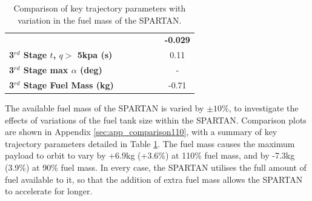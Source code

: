 \begin{table}
\begin{tabular}{l c c c c c c}
	& \textbf{\thirddExergyEffmFuelNinetyNoReturn}
	& \textbf{\thirddExergyEffmFuelNinetyFiveNoReturn}
	& \textbf{\thirddExergyEffmFuelStandardNoReturn}
	& \textbf{\thirddExergyEffmFuelOneHundredFiveNoReturn}
	& \textbf{\thirddExergyEffmFuelOneHundredTenNoReturn}
	& \textbf{-0.029}
	\\
	\textbf{3$^{rd}$ Stage $t$, $q >$ 5kpa (s)}
	& \thirdqOverFivemFuelNinetyNoReturn
	& \thirdqOverFivemFuelNinetyFiveNoReturn
	& \thirdqOverFivemFuelStandardNoReturn
	& \thirdqOverFivemFuelOneHundredFiveNoReturn
	& \thirdqOverFivemFuelOneHundredTenNoReturn
	&0.11
	\\
	\textbf{3$^{rd}$ Stage max $\alpha$ (deg)}
	& \thirdmaxAoAmFuelNinetyNoReturn
	& \thirdmaxAoAmFuelNinetyFiveNoReturn
	& \thirdmaxAoAmFuelStandardNoReturn
	& \thirdmaxAoAmFuelOneHundredFiveNoReturn
	& \thirdmaxAoAmFuelOneHundredTenNoReturn
	& -
	\\
	\textbf{3$^{rd}$ Stage Fuel Mass (kg)}
	& \thirdmFuelmFuelNinetyNoReturn
	& \thirdmFuelmFuelNinetyFiveNoReturn
	& \thirdmFuelmFuelStandardNoReturn
	& \thirdmFuelmFuelOneHundredFiveNoReturn
	& \thirdmFuelmFuelOneHundredTenNoReturn
	&-0.71
	\\
	\hline 
\end{tabular} 
\caption{Comparison of key trajectory parameters with variation in the fuel mass of the SPARTAN.}
\label{tab:comparison110}
\end{table}

The available fuel mass of the SPARTAN is varied by $\pm 10\%$, to investigate the effects of variations of the fuel tank size within the SPARTAN. Comparison plots are shown in Appendix \ref{sec:app_comparison110}, with a summary of key trajectory parameters detailed in Table \ref{tab:comparison110}.
The fuel mass causes the maximum payload to orbit to vary by +6.9kg (+3.6\%) at 110\% fuel mass, and by -7.3kg (3.9\%) at 90\% fuel mass. 
 In every case, the SPARTAN utilises the full amount of fuel available to it, so that the addition of extra fuel mass allows the SPARTAN to accelerate for longer. 

